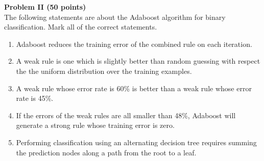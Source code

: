\documentclass[10pt]{article}
\begin{document}
\noindent
    {\bf Problem II (50 points)}\\
    The following statements are about
    the Adaboost algorithm for binary classification. Mark all of the
    correct statements.
    \begin{enumerate}
    \item Adaboost reduces the training error of the combined
      rule on each iteration.
      \item A weak rule is one which is slightly better than random
        guessing with respect the the uniform distribution over the
        training examples.
      \item A weak rule whose error rate is 60\% is better than a weak
        rule whose error rate is 45\%.
      \item If the errors of the  weak rules are all smaller than
        48\%, Adaboost will generate a strong rule whose training error is
        zero.
      \item Performing classification using an alternating
        decision tree requires summing the prediction nodes along a
        path from the root to a leaf.
    \end{enumerate}
\end{document}
